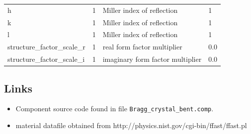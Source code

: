 \begin{longtable}{p{}p{}p{}p{}}
h & 1 & Miller index of reflection & 1 \\
k & 1 & Miller index of reflection & 1 \\
l & 1 & Miller index of reflection & 1 \\
structure\_factor\_scale\_r & 1 & real      form factor multiplier & 0.0 \\
structure\_factor\_scale\_i & 1 & imaginary form factor multiplier & 0.0 \\
\bottomrule
\end{longtable}

\subsection*{Links}
\begin{itemize}
  \item Component source code found in file \texttt{Bragg\_crystal\_bent.comp}.
  \item material datafile obtained from http://physics.nist.gov/cgi-bin/ffast/ffast.pl
\end{itemize}

